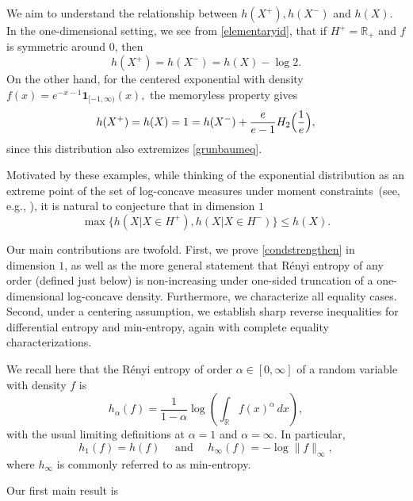\documentclass{article}
\theoremstyle{plain}
\theoremstyle{definition}
\newcommand{\1}{\mathbf 1}
\begin{document}
We aim to understand the relationship between $h(X^+), h(X^-)$ and $h(X)$. In the one-dimensional setting, we see from \eqref{elementaryid}, that if $H^+=\mathbb{R}_+$ and $f$ is symmetric around $0$, then 
$$
h(X^+) = h(X^-) = h(X)-\log{2}.
$$
On the other hand, for the centered exponential with density $f(x)=e^{-x-1}\mathbf{1}_{[-1,\infty)}(x),$ the memoryless property gives
\begin{equation} \label{exponentialvalue}
h(X^+) = h(X) = 1 = h(X^-) + \frac{e}{e-1}H_2\Bigl(\frac{1}{e}\Bigr),
\end{equation}
since this distribution also extremizes \eqref{grunbaumeq}.

Motivated by these examples, while thinking of the exponential distribution as an extreme point of the set of log-concave measures under moment constraints~(see, e.g., \cite{MNR}), it is natural to conjecture that in dimension $1$
\begin{equation} \label{condstrengthen}
    \max{\{h(X|X\in H^+),h(X|X\in H^-)\}} \leq h(X). 
\end{equation}

Our main contributions are twofold. First, we prove \eqref{condstrengthen} in dimension $1$, as well as the more general statement that
R\'enyi entropy of any order (defined just below) is non-increasing under one-sided truncation of a
one-dimensional log-concave density. Furthermore, we characterize all equality
cases. Second, under a centering assumption, we establish sharp reverse
inequalities for differential entropy and min-entropy, again with
complete equality characterizations.

We recall here that the R\'enyi entropy of order
$\alpha\in[0,\infty]$ of a random variable with density $f$ is
\begin{equation} \label{renyidef}
    h_\alpha(f)
    =
    \frac{1}{1-\alpha}
    \log\left(\int_{\mathbb R}f(x)^\alpha\,dx\right),
\end{equation}
with the usual limiting definitions at $\alpha=1$ and
$\alpha=\infty$. In particular,
\[
    h_1(f)=h(f)
    \quad \text{ and } \quad
    h_\infty(f)=-\log\|f\|_\infty,
\]
where $h_\infty$ is commonly referred to as min-entropy.

Our first main result is


\end{document}
